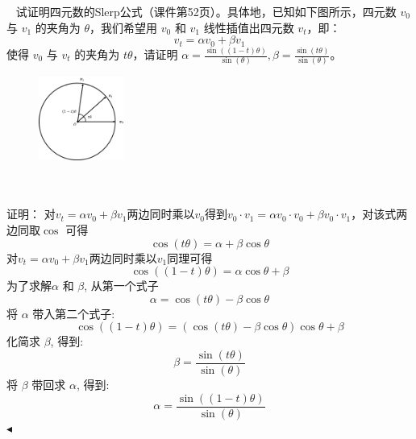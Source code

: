 \documentclass[11pt]{article}
\newenvironment{question}[2][Question]{\begin{trivlist}
\item[\hskip \labelsep {\bfseries #1}\hskip \labelsep {\bfseries #2.}]}{\hfill$\blacktriangleleft$\end{trivlist}}
\begin{document}
    \begin{question}{3 (20') (四元数表示)}~
    试证明四元数的Slerp公式（课件第52页）。具体地，已知如下图所示，四元数 $v_0$ 与 $v_1$ 的夹角为 $\theta$，我们希望用 $v_0$ 和 $v_1$ 线性插值出四元数 $v_t$，即：
    $$
    v_t = \alpha v_0 + \beta v_1
    $$
    使得 $v_0$ 与 $v_t$ 的夹角为 $t\theta$，请证明 $\alpha = \frac{\sin ((1-t)\theta)}{\sin(\theta)}, \beta = \frac{\sin(t\theta)}{\sin(\theta)}$。
    \begin{figure}[h]
        \centering
        \includegraphics[width=0.25\textwidth]{slerp.png}
        \label{fig:my_label}
    \end{figure}
    \\
    \\
    证明：
    对$v_t = \alpha v_0 + \beta v_1$两边同时乘以$v_0$得到$v_0 \cdot v_1 = \alpha v_0 \cdot v_0 + \beta v_0 \cdot v_1$，对该式两边同取$\cos$
    可得
    \[\cos{(t \theta)}  = \alpha +\beta \cos{\theta}\]
    对$v_t = \alpha v_0 + \beta v_1$两边同时乘以$v_1$同理可得
    \[\cos{((1 - t) \theta)}  = \alpha \cos{\theta} +\beta \]
    为了求解\(\alpha\) 和 \(\beta\), 
    从第一个式子
    \[\alpha = \cos{(t \theta)} - \beta \cos{\theta}\]
    将 \(\alpha\) 带入第二个式子:
    \[\cos{((1 - t) \theta)} = (\cos{(t \theta)} - \beta \cos{\theta}) \cos{\theta} + \beta\]
    化简求 \(\beta\), 得到:
    \[\beta = \frac{\sin(t\theta)}{\sin(\theta)}\]
    将 \(\beta\) 带回求 \(\alpha\), 得到:
    \[\alpha = \frac{\sin((1-t)\theta)}{\sin(\theta)}\]
    \end{question}
\end{document}
